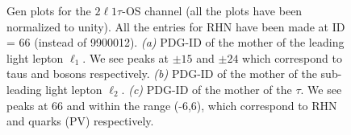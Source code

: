 \documentclass[letterpaper,12pt]{article}
\begin{document}
\vspace{0.7cm}
\begin{figure}[h]
\centering
{}%
\quad
{}%
\quad
{}%
\quad

\caption{Gen plots for the $2\ell1\tau$-OS channel (all the plots have been normalized to unity). All the entries for RHN have been made at ID = 66 (instead of 9900012). \emph{(a)} PDG-ID of the mother of the leading light lepton $\ell_{1}$. We see peaks at $\pm15$ and $\pm24$ which correspond to taus and \Wboson{} bosons respectively. \emph{(b)} PDG-ID of the mother of the sub-leading light lepton $\ell_{2}$. \emph{(c)} PDG-ID of the mother of the $\tau$. We see peaks at 66 and within the range (-6,6), which correspond to RHN and quarks (PV) respectively.}

\label{fig:2l1tOSgen}  
\end{figure}

\vspace{0.7cm}
\end{document}
